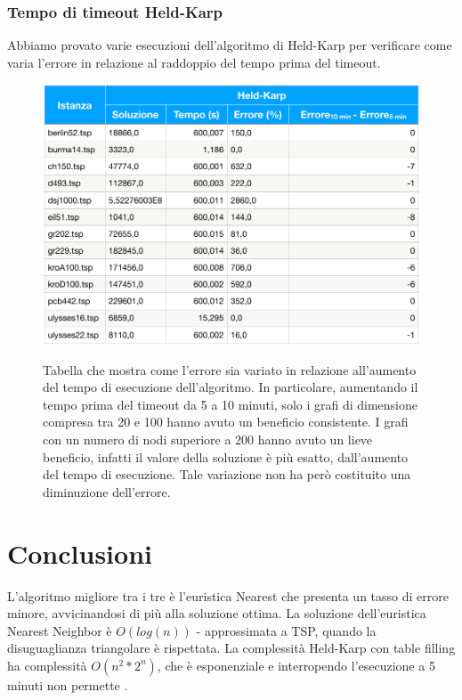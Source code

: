 \documentclass[a4paper]{article}
\begin{document}
\subsubsection{Tempo di timeout Held-Karp}
Abbiamo provato varie esecuzioni dell'algoritmo di Held-Karp per verificare come varia l'errore in relazione al raddoppio del tempo prima del timeout.
\begin{figure}[H]
	\centering
	\includegraphics[width=0.5\linewidth]{differenze_errori}
	\label{fig:timeouttiming}
	\caption{Tabella che mostra come l'errore sia variato in relazione all'aumento del tempo di esecuzione dell'algoritmo. In particolare, aumentando il tempo prima del timeout da 5 a 10 minuti, solo i grafi di dimensione compresa tra 20 e 100 hanno avuto un beneficio consistente. I grafi con un numero di nodi superiore a 200 hanno avuto un lieve beneficio, infatti il valore della soluzione è più esatto, dall'aumento del tempo di esecuzione. Tale variazione non ha però costituito una diminuzione dell'errore.}
\end{figure}

\section{Conclusioni}
L'algoritmo migliore tra i tre è l'euristica Nearest che presenta un tasso di errore minore, avvicinandosi di più alla soluzione ottima. La soluzione dell'euristica Nearest Neighbor è $O(log(n))$ - approssimata a TSP, quando la disuguaglianza triangolare è rispettata. La complessità Held-Karp con table filling ha complessità $O(n^2*2^n)$, che è esponenziale e interropendo l'esecuzione a 5 minuti non permette .
\end{document}
